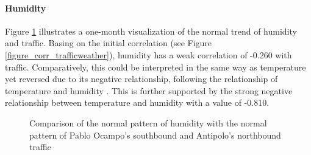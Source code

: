 
\paragraph{Humidity}

Figure \ref{figure_traffic_vs_humidity} illustrates a one-month visualization of the normal trend of humidity and traffic. Basing on the initial correlation (see Figure \ref{figure_corr_trafficweather}), humidity has a weak correlation of -0.260 with traffic. Comparatively, this could be interpreted in the same way as temperature yet reversed due to its negative relationship, following the relationship of temperature and humidity . This is further supported by the strong negative relationship between temperature and humidity with a value of -0.810.

\begin{figure}[h] 
\centering
    \centering
      \captionsetup{justification=centering}
    \hfill
    \caption{Comparison of the normal pattern of humidity with the normal pattern of Pablo Ocampo’s southbound and Antipolo’s northbound traffic}

    \label{figure_traffic_vs_humidity}
\end{figure}

